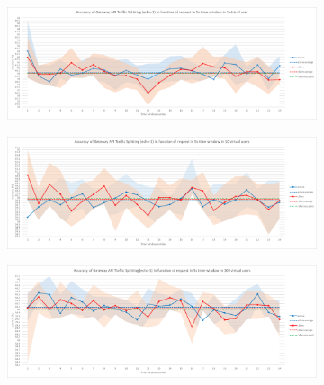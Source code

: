 \begin{figure}[H]
    \centering
    \begin{subfigure}[b]{0.8\textwidth}
        \includegraphics[width=\textwidth]{plots/traffic-splitting/time_window_5_1vu_cloud.png}
        \label{fig:time_window_1vu}
    \end{subfigure}

    \vspace{-0.1cm}

    \begin{subfigure}[b]{0.8\textwidth}
        \includegraphics[width=\textwidth]{plots/traffic-splitting/time_window_5_10vu_cloud.png}
        \label{fig:time_window_10vu}
    \end{subfigure}

    \vspace{-0.1cm}

    \begin{subfigure}[b]{0.8\textwidth}
        \includegraphics[width=\textwidth]{plots/traffic-splitting/time_window_5_100vu_cloud.png}
        \label{fig:time_window_100vu}
    \end{subfigure}


\end{figure}
